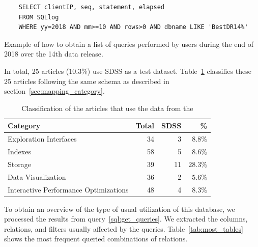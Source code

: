 \begin{listing}[htbp]
\begin{verbatim}
    SELECT clientIP, seq, statement, elapsed
    FROM SQLlog
    WHERE yy=2018 AND mm>=10 AND rows>0 AND dbname LIKE 'BestDR14%'
\end{verbatim}
\caption[Obtaining a list of queries performed by  users]{
    Example of how to obtain a list of queries performed by users during the end of 2018 over the 14th data release.
}\label{sql:get_queries}
\end{listing}

In total, 25 articles ($10.3\%$) use \gls{SDSS} as a test dataset.
Table~\ref{tab:sdss_queries_count} classifies these 25 articles following the same schema as described
in section~\ref{sec:mapping_category}.

\begin{table}[htbp]
  \begin{center}
    \begin{tabular}{l r r r}
      \textbf{Category} & \textbf{Total} & \textbf{SDSS} & \textbf{\%} \\ \hline
      Exploration Interfaces & 34 & 3 & $8.8\%$ \\
      Indexes & 58 & 5 & $8.6\%$ \\
      Storage & 39 & 11 & $28.3\%$ \\
      Data Visualization & 36 & 2 & $5.6\%$ \\
      Interactive Performance Optimizations & 48 & 4 & $8.3\%$ \\
    \end{tabular}
  \end{center}
  \caption{Classification of the articles that use the data from the }\label{tab:sdss_queries_count}
\end{table}

To obtain an overview of the type of usual utilization of this database, we processed
the results from query~\ref{sql:get_queries}. We extracted the columns, relations,
and filters usually affected by the queries.
Table~\ref{tab:most_tables} shows the most frequent queried combinations
of relations.

